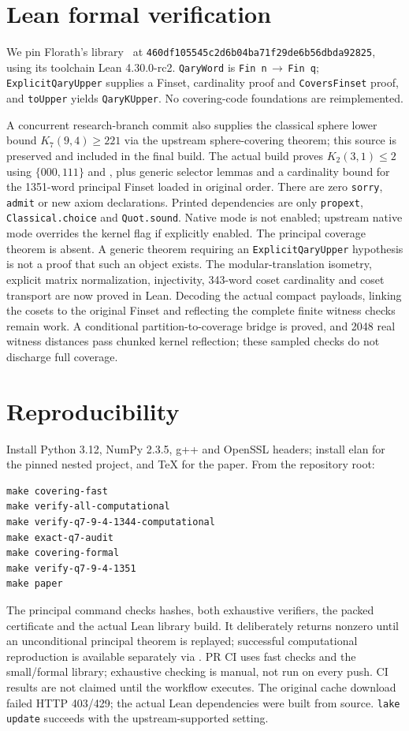 \documentclass[11pt]{article}
\begin{document}
\section{Lean formal verification}
We pin Florath's library~\cite{florath} at
\texttt{460df105545c2d6b04ba71f29de6b56dbda92825}, using its toolchain
Lean 4.30.0-rc2. \texttt{QaryWord} is \texttt{Fin n}\,$\to$\,\texttt{Fin q};
\texttt{ExplicitQaryUpper} supplies a Finset, cardinality proof and
\texttt{CoversFinset} proof, and \texttt{toUpper} yields \texttt{QaryKUpper}.
No covering-code foundations are reimplemented.

A concurrent research-branch commit also supplies the classical sphere lower bound
$K_7(9,4)\ge221$ via the upstream sphere-covering theorem; this source is
preserved and included in the final build. The actual build proves
$K_2(3,1)\le2$ using $\{000,111\}$ and
, plus generic selector lemmas and a cardinality
bound for the 1351-word principal Finset loaded in original order. There are zero
\texttt{sorry}, \texttt{admit} or new axiom declarations. Printed dependencies are
only \texttt{propext}, \texttt{Classical.choice} and \texttt{Quot.sound}.
Native mode is not enabled; upstream native mode overrides the kernel flag if
explicitly enabled. The principal coverage theorem is absent. A generic theorem
requiring an \texttt{ExplicitQaryUpper} hypothesis is not a proof that such an
object exists. The modular-translation isometry, explicit matrix normalization, injectivity, 343-word coset cardinality and coset transport are now proved in Lean. Decoding the actual compact payloads, linking the cosets to the original Finset and reflecting the complete finite witness checks remain work. A conditional
partition-to-coverage bridge is proved, and 2048 real witness distances pass
chunked kernel reflection; these sampled checks do not discharge full coverage.

\section{Reproducibility}
Install Python 3.12, NumPy 2.3.5, g++ and OpenSSL headers; install elan for the
pinned nested project, and TeX for the paper. From the repository root:
\begin{lstlisting}[basicstyle=\ttfamily\small]
make covering-fast
make verify-all-computational
make verify-q7-9-4-1344-computational
make exact-q7-audit
make covering-formal
make verify-q7-9-4-1351
make paper
\end{lstlisting}
The principal command checks hashes, both exhaustive verifiers, the packed
certificate and the actual Lean library build. It deliberately returns nonzero
until an unconditional principal theorem is replayed; successful computational
reproduction is available separately via .
PR CI uses fast checks and the small/formal library; exhaustive checking is manual,
not run on every push. CI results are not claimed until the workflow executes.
The original cache download failed HTTP 403/429; the actual Lean dependencies
were built from source. \texttt{lake update} succeeds with the upstream-supported
 setting.
\end{document}
